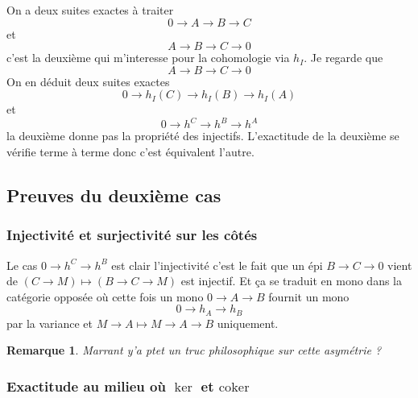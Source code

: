 \documentclass[a4paper,12pt]{book}
\newcommand{\coker}{\textrm{coker}}
\theoremstyle{plain}
\newtheorem{rem}{Remarque}
\theoremstyle{definition}
\theoremstyle{remark}
\begin{document}
On a deux suites exactes à traiter
\[0\to A\to B\to C\]
et 
\[A\to B\to C\to 0\]
c'est la deuxième qui m'interesse pour
la cohomologie via $h_I$. Je regarde que
\[A\to B\to C\to 0\]
On en déduit deux
suites exactes
\[0\to h_I(C)\to h_I(B)\to h_I(A)\]
et
\[0\to h^C\to h^B\to h^A\]
la deuxième donne pas la propriété des injectifs.
L'exactitude de la deuxième se vérifie terme à terme
donc c'est équivalent l'autre.

\subsection{Preuves du deuxième cas}

\subsubsection{Injectivité et surjectivité sur les
côtés}

Le cas $0\to h^C\to h^B$ est clair l'injectivité c'est le fait que
un épi $B\to C\to 0$ vient de $(C\to M)\mapsto (B\to C\to M)$
est injectif.
Et ça se traduit en mono dans la catégorie opposée où
cette fois un mono $0\to A\to B$ fournit un mono
\[0\to h_A\to h_B\]
par la variance et $M\to A\mapsto M\to A\to B$ uniquement.
\begin{rem}
  Marrant y'a ptet un truc philosophique sur cette
  asymétrie ?
\end{rem}
\subsubsection{Exactitude au milieu où $\ker$ et $\coker$}
\end{document}
